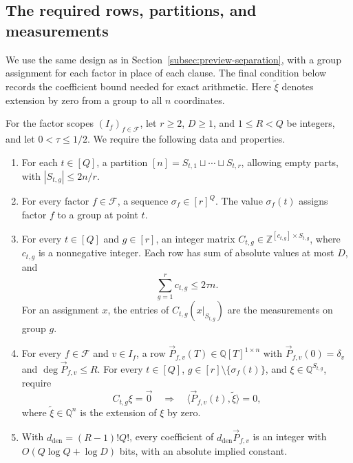 
\subsection{The required rows, partitions, and measurements}
\label{subsec:layout-interface}
We use the same design as in Section~\ref{subsec:preview-separation},
with a group assignment for each factor in place of each clause.
The final condition below records the coefficient bound needed for
exact arithmetic. Here $\widetilde\xi$ denotes extension by zero
from a group to all $n$ coordinates.

\begin{definition}\label{def:layout}
For the factor scopes $(I_f)_{f\in\mathcal F}$, let $r\ge2$, $D\ge1$,
and $1\le R<Q$ be integers, and let $0<\tau\le1/2$.
We require the following data and properties.
\begin{enumerate}
\item For each $t\in[Q]$, a partition
$[n]=S_{t,1}\sqcup\cdots\sqcup S_{t,r}$, allowing empty parts,
with $|S_{t,g}|\le2n/r$.
\item For every factor $f\in\mathcal F$, a sequence
$\sigma_f\in[r]^Q$. The value $\sigma_f(t)$ assigns factor $f$
to a group at point $t$.
\item For every $t\in[Q]$ and $g\in[r]$, an integer matrix
$C_{t,g}\in\mathbb Z^{[c_{t,g}]\times S_{t,g}}$, where
$c_{t,g}$ is a nonnegative integer. Each row has sum of absolute
values at most $D$, and
\[
 \sum_{g=1}^r c_{t,g}\le2\tau n.
\]
For an assignment $x$, the entries of
$C_{t,g}(x|_{S_{t,g}})$ are the measurements on group $g$.
\item For every $f\in\mathcal F$ and $v\in I_f$, a row
$\vec{P}_{f,v}(T)\in\mathbb Q[T]^{1\times n}$ with
$\vec{P}_{f,v}(0)=\delta_v$ and $\deg \vec{P}_{f,v}\le R$.
For every $t\in[Q]$, $g\in[r]\setminus\{\sigma_f(t)\}$, and
$\xi\in\mathbb Q^{S_{t,g}}$, require
\[
 C_{t,g}\xi=\vec{0}\quad\Longrightarrow\quad
 \langle \vec{P}_{f,v}(t), \widetilde\xi\rangle=0,
\]
where $\widetilde\xi\in\mathbb Q^n$ is the extension of $\xi$ by zero.
\item With $d_{\mathrm{den}}=(R-1)!Q!$, every coefficient of
$d_{\mathrm{den}} \vec{P}_{f,v}$ is an integer with
$O(Q\log Q+\log D)$ bits, with an absolute implied constant.
\end{enumerate}
\end{definition}

